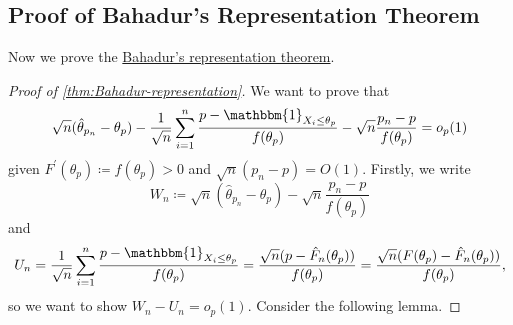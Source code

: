 \subsection{Proof of Bahadur's Representation Theorem}
Now we prove the \hyperref[thm:Bahadur-representation]{Bahadur's representation theorem}.

\begin{proof}[Proof of \autoref{thm:Bahadur-representation}]\label{pf:Bahadur-representation}
	We want to prove that
	\[
		\sqrt{n} (\hat{\theta} _{p_n} - \theta _p) - \frac{1}{\sqrt{n} } \sum_{i=1}^{n} \frac{p - \mathbbm{1}_{X_i \leq \theta _p} }{f(\theta _p)} - \sqrt{n} \frac{p_n - p}{f(\theta _p)} = o_p(1)
	\]
	given \(F^{\prime} (\theta _p) \coloneqq f(\theta _p) > 0\) and \(\sqrt{n} (p_n - p) = O(1)\). Firstly, we write
	\[
		W_n \coloneqq \sqrt{n} (\hat{\theta} _{p_n} - \theta _p) - \sqrt{n} \frac{p_n - p}{f(\theta _p)}
	\]
	and
	\[
		U_n
		= \frac{1}{\sqrt{n} } \sum_{i=1}^{n} \frac{p - \mathbbm{1}_{X_i \leq \theta _p} }{f(\theta _p)}
		= \frac{\sqrt{n} (p - \hat{F} _n (\theta _p))}{f(\theta _p)}
		= \frac{\sqrt{n} (F(\theta _p) - \hat{F} _n(\theta _p))}{f(\theta _p)},
	\]
	so we want to show \(W_n - U_n = o_p(1)\). Consider the following lemma.


\end{proof}
